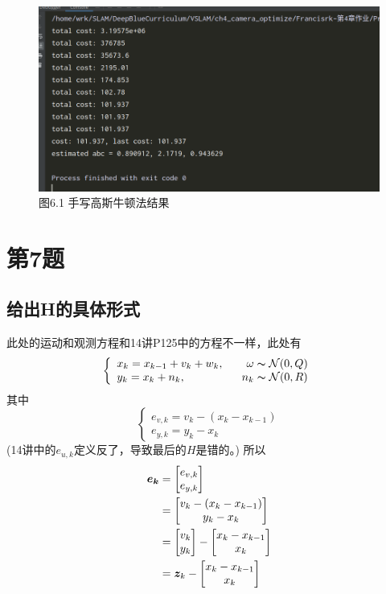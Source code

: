 \documentclass[40pt,a4paper，UTF8]{ctexart}
\numberwithin{equation}{section}
\begin{document}
\begin{figure}[H]
\centering
\includegraphics[width=4.8in]{ch4_6_1.png} {图6.1 手写高斯牛顿法结果}
\end{figure}

\section{第7题}
\subsection{给出H的具体形式}
此处的运动和观测方程和14讲P125中的方程不一样，此处有
\begin{equation}
\left\{
\begin{array}{l}
x_k = x_{k-1}+v_{k}+w_{k},  \quad\quad  \omega\thicksim \mathcal{N}(0,Q) \\
y_k = x_k+n_k, \quad \quad\quad\quad\quad n_k\thicksim \mathcal{N}(0,R) 
\end{array}
\right.
\end{equation}
其中
\begin{equation}
\left\{
\begin{array}{l}
e_{v,k}=v_k-(x_k-x_{k-1}) \\
e_{y,k}=y_k-x_k
\end{array}
\right.
\end{equation}
(14讲中的$e_{u,k}$定义反了，导致最后的$H$是错的。)
所以
\begin{align}
\bm{e_k}
&= 
\begin{bmatrix}
e_{v,k} \\
e_{y,k}
\end{bmatrix} \notag \\
&=\begin{bmatrix}
v_k-(x_k-x_{k-1})\\
y_k-x_k
\end{bmatrix} \notag \\
&=
\begin{bmatrix}
v_k\\y_k
\end{bmatrix}
-
\begin{bmatrix}
x_k-x_{k-1} \\
x_k
\end{bmatrix} \notag \\
&=\bm z_k-
\begin{bmatrix}
x_k-x_{k-1} \\
x_k
\end{bmatrix}
\end{align}
\end{document}
